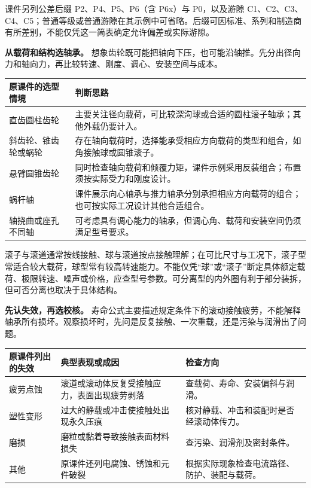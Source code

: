 \documentclass[zihao=5,a4paper,UTF8,fontset=fandol]{ctexart}
\begin{document}
课件另列公差后缀 P2、P4、P5、P6（含 P6x）与 P0，以及游隙 C1、C2、C3、C4、C5；普通等级或普通游隙在其示例中可省略。后缀可因标准、系列和制造商有所差别，不能仅凭这一简表确定允许偏差或实际游隙。


\textbf{从载荷和结构选轴承。} 想象齿轮既可能把轴向下压，也可能沿轴推。先分出径向力和轴向力，再比较转速、刚度、调心、安装空间与成本。


\begin{longtable}{p{7.51cm}p{7.51cm}}
\toprule
原课件的选型情境 & 判断思路 \\

\midrule
\endhead
直齿圆柱齿轮 & 主要关注径向载荷，可比较深沟球或合适的圆柱滚子轴承；其他外载仍要计入。 \\
斜齿轮、锥齿轮或蜗轮 & 存在轴向载荷时，选择能承受相应方向载荷的类型和组合，如角接触球或圆锥滚子。 \\
悬臂圆锥齿轮 & 同时检查轴向载荷和倾覆力矩，课件示例采用反装组合；布置须按实际受力和刚度设计。 \\
蜗杆轴 & 课件展示向心轴承与推力轴承分别承担相应方向载荷的组合；也可按实际工况设计其他合适组合。 \\
轴挠曲或座孔不同轴 & 可考虑具有调心能力的轴承，但调心角、载荷和安装空间仍须满足型号要求。 \\
\bottomrule
\end{longtable}

滚子与滚道通常按线接触、球与滚道按点接触理解；在可比尺寸与工况下，滚子型常适合较大载荷，球型常有较高转速能力。不能仅凭“球”或“滚子”断定具体额定载荷、极限转速、噪声或价格，应查型号参数。可分离型的内外圈有利于部分装拆，但可否分离也取决于具体结构。


\textbf{先认失效，再选校核。} 寿命公式主要描述规定条件下的滚动接触疲劳，不能解释轴承所有损坏。观察损坏时，先问是反复接触、一次重载，还是污染与润滑出了问题。


\begin{longtable}{p{4.86cm}p{4.86cm}p{4.86cm}}
\toprule
原课件列出的失效 & 典型表现或成因 & 检查方向 \\

\midrule
\endhead
疲劳点蚀 & 滚道或滚动体反复受接触应力，表面出现疲劳剥落 & 查载荷、寿命、安装偏斜与润滑。 \\
塑性变形 & 过大的静载或冲击使接触处出现永久压痕 & 核对静载、冲击和装配时是否经滚动体传力。 \\
磨损 & 磨粒或黏着导致接触表面材料损失 & 查污染、润滑剂及密封条件。 \\
其他 & 原课件还列电腐蚀、锈蚀和元件破裂 & 根据实际现象检查电流路径、防护、装配与载荷。 \\
\bottomrule
\end{longtable}
\end{document}
